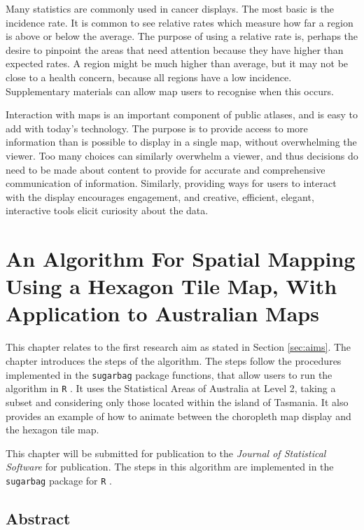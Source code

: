 \documentclass{monashthesis}
\begin{document}
Many statistics are commonly used in cancer displays. The most basic is the incidence rate. It is common to see relative rates which measure how far a region is above or below the average. The purpose of using a relative rate is, perhaps the desire to pinpoint the areas that need attention because they have higher than expected rates.
A region might be much higher than average, but it may not be close to a health concern, because all regions have a low incidence. Supplementary materials can allow map users to recognise when this occurs.

Interaction with maps is an important component of public atlases, and is easy to add with today's technology. The purpose is to provide access to more information than is possible to display in a single map, without overwhelming the viewer. Too many choices can similarly overwhelm a viewer, and thus decisions do need to be made about content to provide for accurate and comprehensive communication of information. Similarly, providing ways for users to interact with the display encourages engagement, and creative, efficient, elegant, interactive tools elicit curiosity about the data.

\hypertarget{algorithm}{%
\chapter{An Algorithm For Spatial Mapping Using a Hexagon Tile Map, With Application to Australian Maps}\label{algorithm}}

This chapter relates to the first research aim as stated in Section \ref{sec:aims}.
The chapter introduces the steps of the algorithm.
The steps follow the procedures implemented in the \texttt{sugarbag} \autocite{sugarbag} package functions, that allow users to run the algorithm in \texttt{R} \autocite{R}. It uses the Statistical Areas of Australia at Level 2, taking a subset and considering only those located within the island of Tasmania.
It also provides an example of how to animate between the choropleth map display and the hexagon tile map.

This chapter will be submitted for publication to the \emph{Journal of Statistical Software} for publication.
The steps in this algorithm are implemented in the \texttt{sugarbag} \autocite{sugarbag} package for \texttt{R} \autocite{R}.

\hypertarget{abstract3}{%
\section*{Abstract}\label{abstract3}}
\end{document}
